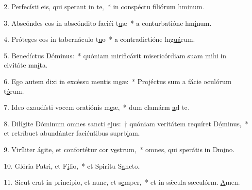 2. Perfecísti eis, qui sperant \uline{i}n te,~* in conspéctu filiórum hm\uline{i}num.\par 
3. Abscóndes eos in abscóndito faciéi t\uline{u}æ~* a conturbatióne hm\uline{i}num.\par 
4. Próteges eos in tabernáculo t\uline{u}o~* a contradictióne ln\uline{guá}rum.\par 
5. Benedíctus D\uline{ó}minus:~* quóniam mirificávit misericórdiam suam mihi in civitáte mn\uline{í}ta.\par 
6. Ego autem dixi in excéssu mentis m\uline{e}æ:~* Projéctus sum a fácie oculórum t\uline{ó}rum.\par 
7. Ideo exaudísti vocem oratiónis m\uline{e}æ,~* dum clamárm \uline{a}d te.\par 
8. Dilígite Dóminum omnes sancti \uline{e}jus:~† quóniam veritátem requíret D\uline{ó}minus,~* et retríbuet abundánter faciéntibus suprb\uline{i}am.\par 
9. Viríliter ágite, et confortétur cor v\uline{e}strum,~* omnes, qui sperátis in Dm\uline{i}no.\par 
10. Glória Patri, et F\uline{í}lio,~* et Spirítu S\uline{a}ncto.\par 
11. Sicut erat in princípio, et nunc, et s\uline{e}mper,~* et in sǽcula sæculórm. \uline{A}men.\par 
